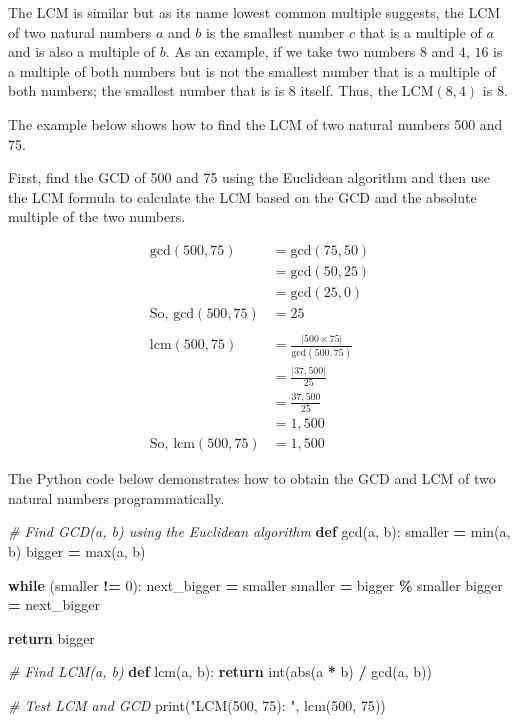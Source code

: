 \documentclass[
]{book}
\newenvironment{Shaded}{\begin{snugshade}}{\end{snugshade}}
\newcommand{\BuiltInTok}[1]{#1}
\newcommand{\CommentTok}[1]{\textcolor[rgb]{0.56,0.35,0.01}{\textit{#1}}}
\newcommand{\ControlFlowTok}[1]{\textcolor[rgb]{0.13,0.29,0.53}{\textbf{#1}}}
\newcommand{\DecValTok}[1]{\textcolor[rgb]{0.00,0.00,0.81}{#1}}
\newcommand{\KeywordTok}[1]{\textcolor[rgb]{0.13,0.29,0.53}{\textbf{#1}}}
\newcommand{\NormalTok}[1]{#1}
\newcommand{\OperatorTok}[1]{\textcolor[rgb]{0.81,0.36,0.00}{\textbf{#1}}}
\newcommand{\StringTok}[1]{\textcolor[rgb]{0.31,0.60,0.02}{#1}}
\begin{document}
The LCM is similar but as its name lowest common multiple suggests, the LCM of two natural numbers \(a\) and \(b\) is the smallest number \(c\) that is a multiple of \(a\) and is also a multiple of \(b\). As an example, if we take two numbers \(8\) and \(4\), \(16\) is a multiple of both numbers but is not the smallest number that is a multiple of both numbers; the smallest number that is is \(8\) itself. Thus, the \(\text{LCM}(8, 4)\) is \(8\).

The example below shows how to find the LCM of two natural numbers 500 and 75.

First, find the GCD of 500 and 75 using the Euclidean algorithm and then use the LCM formula to calculate the LCM based on the GCD and the absolute multiple of the two numbers.

\[
\begin{aligned}
\text{gcd}(500, 75) &= \text{gcd}(75, 50) \\
&= \text{gcd}(50, 25) \\
&= \text{gcd}(25, 0) \\
\text{So, gcd}(500, 75) &= 25 \\
 \\
\text{lcm}(500, 75) &= \frac{\lvert 500 \times 75 \rvert}{\text{gcd}(500, 75)} \\
&= \frac{\lvert 37,500 \rvert}{25} \\
&= \frac{37,500}{25} \\
&= 1,500 \\
\text{So, lcm}(500, 75) &= 1,500
\end{aligned}
\]

The Python code below demonstrates how to obtain the GCD and LCM of two natural numbers programmatically.

\begin{Shaded}
\begin{Highlighting}[]
\CommentTok{\# Find GCD(a, b) using the Euclidean algorithm}
\KeywordTok{def}\NormalTok{ gcd(a, b):}
\NormalTok{    smaller }\OperatorTok{=} \BuiltInTok{min}\NormalTok{(a, b)}
\NormalTok{    bigger }\OperatorTok{=} \BuiltInTok{max}\NormalTok{(a, b)}

    \ControlFlowTok{while}\NormalTok{ (smaller }\OperatorTok{!=} \DecValTok{0}\NormalTok{):}
\NormalTok{        next\_bigger }\OperatorTok{=}\NormalTok{ smaller}
\NormalTok{        smaller }\OperatorTok{=}\NormalTok{ bigger }\OperatorTok{\%}\NormalTok{ smaller}
\NormalTok{        bigger }\OperatorTok{=}\NormalTok{ next\_bigger}

    \ControlFlowTok{return}\NormalTok{ bigger}

\CommentTok{\# Find LCM(a, b)}
\KeywordTok{def}\NormalTok{ lcm(a, b):}
    \ControlFlowTok{return} \BuiltInTok{int}\NormalTok{(}\BuiltInTok{abs}\NormalTok{(a }\OperatorTok{*}\NormalTok{ b) }\OperatorTok{/}\NormalTok{ gcd(a, b))}

\CommentTok{\# Test LCM and GCD}
\BuiltInTok{print}\NormalTok{(}\StringTok{"LCM(500, 75): "}\NormalTok{, lcm(}\DecValTok{500}\NormalTok{, }\DecValTok{75}\NormalTok{))}
\end{Highlighting}
\end{Shaded}
\end{document}
